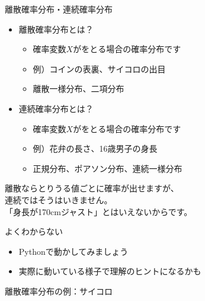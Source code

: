 \documentclass[dvipdfmx,cjk]{beamer}
\begin{document}
\begin{frame}{離散確率分布・連続確率分布} \pause

\begin{itemize}

    \item 離散確率分布とは？ \pause
        \begin{itemize}
        \item 確率変数$X$がをとる場合の確率分布です \pause
        \item 例）コインの表裏、サイコロの出目  \pause
        \item 離散一様分布、二項分布 \pause
        \end{itemize}

    \item 連続確率分布とは？ \pause
        \begin{itemize}
        \item 確率変数$X$がをとる場合の確率分布です \pause
        \item 例）花弁の長さ、16歳男子の身長 \pause
        \item 正規分布、ポアソン分布、連続一様分布 \pause
        \end{itemize}

\end{itemize}

\vskip 1cm

離散ならとりうる値ごとに確率が出せますが、\\
連続ではそうはいきません。\\ \pause
「身長が170cmジャスト」とはいえないからです。

\end{frame}


\begin{frame}{よくわからない} \pause

\begin{itemize}
    \item Pythonで動かしてみましょう
    \item 実際に動いている様子で理解のヒントになるかも
\end{itemize}

\end{frame}


\begin{frame}{離散確率分布の例：サイコロ}


\end{frame}
\end{document}
